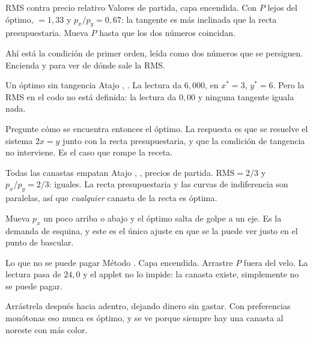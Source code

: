 \documentclass[11pt,a4paper]{appletmanual}
\begin{document}
\begin{activity}{RMS contra precio relativo}
\amset Valores de partida, capa  encendida.
\amexp Con $P$ lejos del óptimo,  $= 1{,}33$ y $p_x/p_y = 0{,}67$: la
tangente es más inclinada que la recta presupuestaria. Mueva $P$ hasta que los
dos números coincidan.
\par\smallskip
Ahí está la condición de primer orden, leída como dos números que se
persiguen. Encienda  y  para ver de dónde sale la
RMS.
\end{activity}

\begin{activity}{Un óptimo sin tangencia}
\amset Atajo , .
\amexp La lectura  da $6{,}000$, en $x^\ast = 3$, $y^\ast = 6$. Pero
la RMS en el codo no está definida: la lectura da $0{,}00$ y ninguna tangente
iguala nada.
\par\smallskip
Pregunte cómo se encuentra entonces el óptimo. La respuesta es que se resuelve
el sistema $2x = y$ junto con la recta presupuestaria, y que la condición de
tangencia no interviene. Es el caso que rompe la receta.
\end{activity}

\begin{activity}{Todas las canastas empatan}
\amset Atajo , , precios de partida.
\amexp $\text{RMS} = 2/3$ y $p_x/p_y = 2/3$: iguales. La recta presupuestaria y
las curvas de indiferencia son paralelas, así que \emph{cualquier} canasta de
la recta es óptima.
\par\smallskip
Mueva $p_x$ un poco arriba o abajo y el óptimo salta de golpe a un eje. Es la
demanda de esquina, y este es el único ajuste en que se la puede ver justo en
el punto de bascular.
\end{activity}

\begin{activity}{Lo que no se puede pagar}
\amset Método . Capa  encendida.
\amexp Arrastre $P$ fuera del velo. La lectura  pasa de $24{,}0$ y
el applet no lo impide: la canasta existe, simplemente no se puede pagar.
\par\smallskip
Arrástrela después hacia adentro, dejando dinero sin gastar. Con preferencias
monótonas eso nunca es óptimo, y se ve porque siempre hay una canasta al
noreste con más color.
\end{activity}
\end{document}
